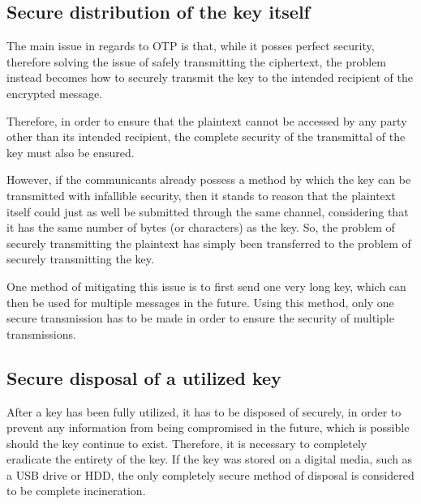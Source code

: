 \documentclass[12pt]{report}
\begin{document}
\subsection{Secure distribution of the key itself}
The main issue in regards to OTP is that, while it posses perfect security, therefore solving the issue of safely transmitting the ciphertext, the problem instead becomes how to securely transmit the key to the intended recipient of the encrypted message.

Therefore, in order to ensure that the plaintext cannot be accessed by any party other than its intended recipient, the complete security of the transmittal of the key must also be ensured.

However, if the communicants already possess a method by which the key can be transmitted with infallible security, then it stands to reason that the plaintext itself could just as well be submitted through the same channel, considering that it has the same number of bytes (or characters) as the key. So, the problem of securely transmitting the plaintext has simply been transferred to the problem of securely transmitting the key.




One method of mitigating this issue is to first send one very long key, which can then be used for multiple messages in the future. Using this method, only one secure transmission has to be made in order to ensure the security of multiple transmissions. 

\subsection{Secure disposal of a utilized key}
After a key has been fully utilized, it has to be disposed of securely, in order to prevent any information from being compromised in the future, which is possible should the key continue to exist. Therefore, it is necessary to completely eradicate the entirety of the key. If the key was stored on a digital media, such as a USB drive or HDD, the only completely secure method of disposal is considered to be complete incineration.


\printbibliography
\end{document}
